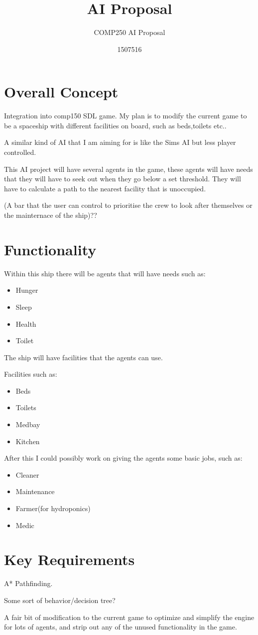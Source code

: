 \documentclass{scrartcl}
\title{AI Proposal}
\subtitle{COMP250 AI Proposal}
\author{1507516}
\begin{document}
\maketitle

\section{Overall Concept}
Integration into comp150 SDL game.
My plan is to modify the current game to be a spaceship with different facilities on board, such as beds,toilets etc..

A similar kind of AI that I am aiming for is like the Sims AI but less player controlled.

This AI project will have several agents in the game, these agents will have needs that they will have to seek out when they go below a set threshold. 
They will have to calculate a path to the nearest facility that is unoccupied.

(A bar that the user can control to prioritise the crew to look after themselves or the mainternace of the ship)??


\section{Functionality}
Within this ship there will be agents that will have needs such as:

\begin{itemize}
  \item Hunger
  \item Sleep
  \item Health
  \item Toilet
\end{itemize}

The ship will have facilities that the agents can use.

Facilities such as:

\begin{itemize}
  \item Beds
  \item Toilets
  \item Medbay
  \item Kitchen
\end{itemize}

After this I could possibly work on giving the agents some basic jobs, such as:

\begin{itemize}
	\item Cleaner
	\item Maintenance
	\item Farmer(for hydroponics)
	\item Medic
\end{itemize}

\section{Key Requirements}

A* Pathfinding.

Some sort of behavior/decision tree?

A fair bit of modification to the current game to optimize and simplify the engine for lots of agents, and strip out any of the unused functionality in the game.
\end{document}
